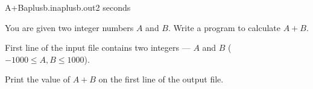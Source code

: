 \begin{problem}{A+B}{aplusb.in}{aplusb.out}{2 seconds}

You are given two integer numbers $A$ and $B$. 
Write a program to calculate $A+B$. 

\InputFile

First line of the input file contains two integers --- $A$ and $B$ 
($-1000 \le A,B \le 1000$).

\OutputFile

Print the value of $A+B$ on the first line of the output file.

\Example

\begin{example}[*]
%
%
\end{example}

\end{problem}
